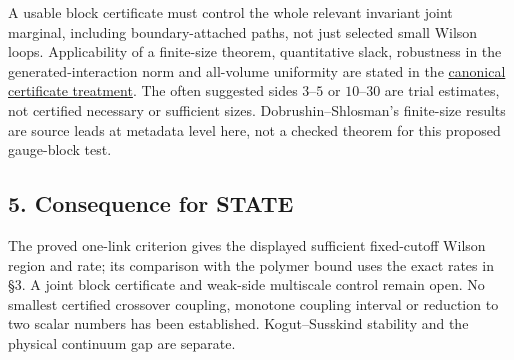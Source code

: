 \documentclass[11pt,a4paper]{article}
\begin{document}
A usable block certificate must control the whole relevant invariant
joint marginal, including boundary-attached paths, not just selected
small Wilson loops. Applicability of a finite-size theorem, quantitative
slack, robustness in the generated-interaction norm and all-volume
uniformity are stated in the
\href{mass-gap-conditional-theorem.md\#what-a-finite-certificate-would-have-to-prove}{canonical
certificate treatment}. The often suggested sides \(3\)--\(5\) or
\(10\)--\(30\) are trial estimates, not certified necessary or
sufficient sizes. Dobrushin--Shlosman's finite-size results are source
leads at metadata level here, not a checked theorem for this proposed
gauge-block test.

\hypertarget{consequence-for-state}{%
\subsection{5. Consequence for STATE}\label{consequence-for-state}}

The proved one-link criterion gives the displayed sufficient
fixed-cutoff Wilson region and rate; its comparison with the polymer
bound uses the exact rates in §3. A joint block certificate and
weak-side multiscale control remain open. No smallest certified
crossover coupling, monotone coupling interval or reduction to two
scalar numbers has been established. Kogut--Susskind stability and the
physical continuum gap are separate.
\end{document}
